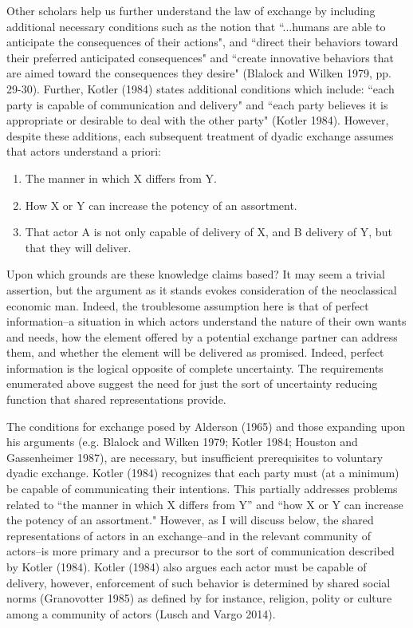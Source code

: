 Other scholars help us further understand the law of exchange by including additional necessary conditions such as the notion that ``...humans are able to anticipate the consequences of their actions", and ``direct their behaviors toward their preferred anticipated consequences" and ``create innovative behaviors that are aimed toward the consequences they desire" (Blalock and Wilken 1979, pp. 29-30).  Further, Kotler (1984) states additional conditions which include: ``each party is capable of communication and delivery" and ``each party believes it is appropriate or desirable to deal with the other party" (Kotler 1984). However, despite these additions, each subsequent treatment of dyadic exchange assumes that actors understand a priori: 

\begin{enumerate}
  \item The manner in which X differs from Y.
  \item How X or Y can increase the potency of an assortment.
  \item That actor A is not only capable of delivery of X, and B delivery of Y, but that they will deliver. 
\end{enumerate}

Upon which grounds are these knowledge claims based? It may seem a trivial assertion, but the argument as it stands evokes consideration of the neoclassical economic man. Indeed, the troublesome assumption here is that of perfect information--a situation in which actors understand the nature of their own wants and needs, how the element offered by a potential exchange partner can address them, and whether the element will be delivered as promised. Indeed, perfect information is the logical opposite of complete uncertainty. The requirements enumerated above suggest the need for just the sort of uncertainty reducing function that shared representations provide. 

The conditions for exchange posed by Alderson (1965) and those expanding upon his arguments (e.g. Blalock and Wilken 1979; Kotler 1984; Houston and Gassenheimer 1987), are necessary, but insufficient prerequisites to voluntary dyadic exchange. Kotler (1984) recognizes that each party must (at a minimum) be capable of communicating their intentions. This partially addresses problems related to ``the manner in which X differs from Y'' and ``how X or Y can increase the potency of an assortment." However, as I will discuss below, the shared representations of actors in an exchange--and in the relevant community of actors--is more primary and a precursor to the sort of communication described by Kotler (1984). Kotler (1984) also argues each actor must be capable of delivery, however, enforcement of such behavior is determined by shared social norms (Granovotter 1985) as defined by for instance, religion, polity or culture among a community of actors (Lusch and Vargo 2014). 


